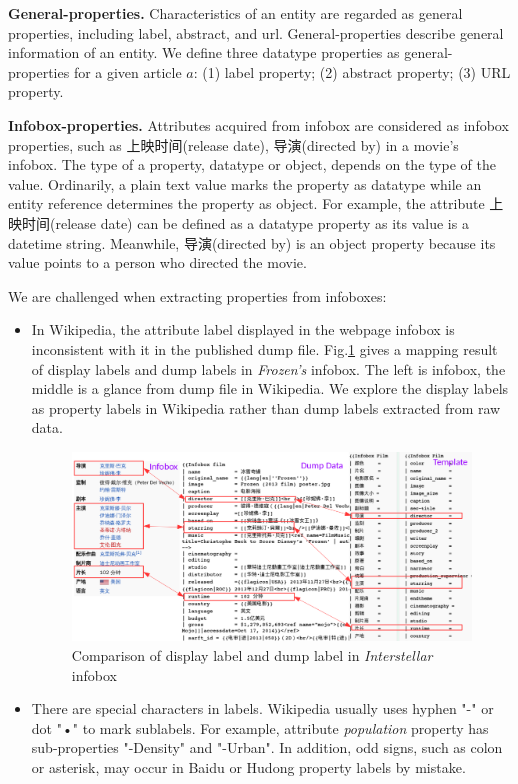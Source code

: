\documentclass[runningheads,a4paper]{llncs}
\newcommand{\para}[1]{\vspace{0.1cm}\noindent\textbf{#1}}
\begin{document}
\para{General-properties.} Characteristics of an entity are regarded as general properties, including label, abstract, and url. General-properties describe general information of an entity. We define three datatype properties as general-properties for a given article $a$: (1) label property; (2) abstract property; (3) URL property.

\para{Infobox-properties.} Attributes acquired from infobox are considered as infobox properties, such as 上映时间(release date), 导演(directed by) in a movie's infobox. The type of a property, datatype or object, depends on the type of the value. Ordinarily, a plain text value marks the property as datatype while an entity reference determines the property as object. For example, the attribute 上映时间(release date) can be defined as a datatype property as its value is a datetime string. Meanwhile, 导演(directed by) is an object property because its value points to a person who directed the movie.

We are challenged when extracting properties from infoboxes:
\begin{itemize}
    \item In Wikipedia, the attribute label displayed in the webpage infobox is inconsistent with it in the published dump file. Fig.\ref{fig:infobox-template} gives a mapping result of display labels and dump labels in \emph{Frozen's} infobox. The left is infobox, the middle is a glance from dump file in Wikipedia. We explore the display labels as property labels in Wikipedia rather than dump labels extracted from raw data.
    \begin{figure}[ht]
        \centerline{\includegraphics[width=1\columnwidth]{fig/infobox-template}}
        \caption{Comparison of display label and dump label in \emph{Interstellar} infobox}
        \label{fig:infobox-template}
    \end{figure}%
\item There are special characters in labels. Wikipedia usually uses hyphen "-" or dot "•" to mark sublabels. For example, attribute \emph{population} property has sub-properties "-Density" and "-Urban". In addition, odd signs, such as colon or asterisk, may occur in Baidu or Hudong property labels by mistake.
\end{itemize}
\end{document}
